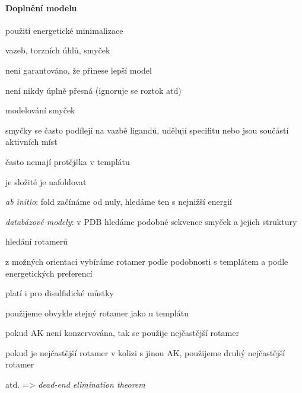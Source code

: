 \documentclass[DIV=8]{scrreprt}
\begin{document}
\paragraph{Doplnění modelu}
\begin{myItemize}[nosep]
    \item použití energetické minimalizace
\begin{myItemize}[nosep]
    \item vazeb, torzních úhlů, smyček
    \item není garantováno, že přinese lepší model
    \item není nikdy úplně přesná (ignoruje se roztok atd)
\end{myItemize}

    \item modelování smyček
\begin{myItemize}[nosep]
    \item smyčky se často podílejí na vazbě ligandů, udělují specifitu nebo jsou součástí aktivních míst
    \item často nemají protějška v templátu
    \item je složité je nafoldovat
\begin{myItemize}[nosep]
    \item \emph{ab initio}: fold začínáme od nuly, hledáme ten s nejnižší energií
    \item \emph{databázové modely}: v PDB hledáme podobné sekvence smyček a jejich struktury
\end{myItemize}

\end{myItemize}

    \item hledání rotamerů
\begin{myItemize}[nosep]
    \item z možných orientací vybíráme rotamer podle podobnosti s templátem a podle energetických preferencí
    \item platí i pro disulfidické můstky
    \item použijeme obvykle stejný rotamer jako u templátu
\begin{myItemize}[nosep]
    \item pokud AK není konzervována, tak se použije nejčastější rotamer
    \item pokud je nejčastější rotamer v kolizi s jinou AK, použijeme druhý nejčastější rotamer
    \item atd. => \emph{dead-end elimination theorem}
\end{myItemize}

\end{myItemize}

\end{myItemize}
\end{document}
